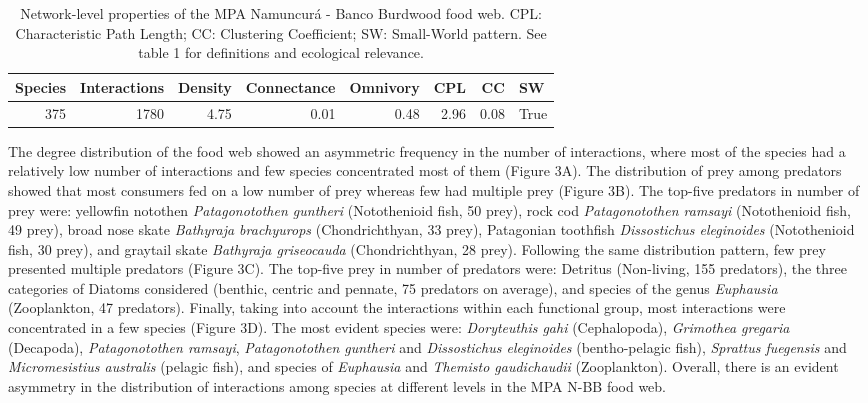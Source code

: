 \documentclass[preprint, 3p,
authoryear]{elsarticle} %
\begin{document}
\begin{table}

\caption{\label{tab:table2}Network-level properties of the MPA Namuncurá - Banco Burdwood food web. CPL: Characteristic Path Length; CC: Clustering Coefficient; SW: Small-World pattern. See table 1 for definitions and ecological relevance.}
\centering
\begin{tabular}[t]{r|r|r|r|r|r|r|l}
\hline
\textbf{Species} & \textbf{Interactions} & \textbf{Density} & \textbf{Connectance} & \textbf{Omnivory} & \textbf{CPL} & \textbf{CC} & \textbf{SW}\\
\hline
375 & 1780 & 4.75 & 0.01 & 0.48 & 2.96 & 0.08 & True\\
\hline
\end{tabular}
\end{table}

The degree distribution of the food web showed an asymmetric frequency
in the number of interactions, where most of the species had a
relatively low number of interactions and few species concentrated most
of them (Figure 3A). The distribution of prey among predators showed
that most consumers fed on a low number of prey whereas few had multiple
prey (Figure 3B). The top-five predators in number of prey were:
yellowfin notothen \emph{Patagonotothen guntheri} (Notothenioid fish, 50
prey), rock cod \emph{Patagonotothen ramsayi} (Notothenioid fish, 49
prey), broad nose skate \emph{Bathyraja brachyurops} (Chondrichthyan, 33
prey), Patagonian toothfish \emph{Dissostichus eleginoides}
(Notothenioid fish, 30 prey), and graytail skate \emph{Bathyraja
griseocauda} (Chondrichthyan, 28 prey). Following the same distribution
pattern, few prey presented multiple predators (Figure 3C). The top-five
prey in number of predators were: Detritus (Non-living, 155 predators),
the three categories of Diatoms considered (benthic, centric and
pennate, 75 predators on average), and species of the genus
\emph{Euphausia} (Zooplankton, 47 predators). Finally, taking into
account the interactions within each functional group, most interactions
were concentrated in a few species (Figure 3D). The most evident species
were: \emph{Doryteuthis gahi} (Cephalopoda), \emph{Grimothea gregaria}
(Decapoda), \emph{Patagonotothen ramsayi}, \emph{Patagonotothen
guntheri} and \emph{Dissostichus eleginoides} (bentho-pelagic fish),
\emph{Sprattus fuegensis} and \emph{Micromesistius australis} (pelagic
fish), and species of \emph{Euphausia} and \emph{Themisto gaudichaudii}
(Zooplankton). Overall, there is an evident asymmetry in the
distribution of interactions among species at different levels in the
MPA N-BB food web.
\end{document}

